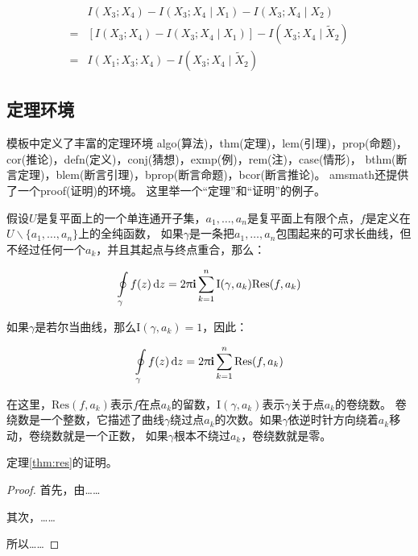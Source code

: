\begin{align}
  \label{eq:none}
  & I(X_3;X_4)-I(X_3;X_4\mid{}X_1)-I(X_3;X_4\mid{}X_2) \nonumber \\
  = & [I(X_3;X_4)-I(X_3;X_4\mid{}X_1)]-I(X_3;X_4\mid{}\tilde{X}_2) \\
  = & I(X_1;X_3;X_4)-I(X_3;X_4\mid{}\tilde{X}_2)
\end{align}

\subsection{定理环境}

模板中定义了丰富的定理环境
algo(算法)，thm(定理)，lem(引理)，prop(命题)，cor(推论)，defn(定义)，conj(猜想)，exmp(例)，rem(注)，case(情形)，
bthm(断言定理)，blem(断言引理)，bprop(断言命题)，bcor(断言推论)。
amsmath还提供了一个proof(证明)的环境。
这里举一个“定理”和“证明”的例子。
\begin{thm}[留数定理]
\label{thm:res}
  假设$U$是复平面上的一个单连通开子集，$a_1,\ldots,a_n$是复平面上有限个点，$f$是定义在$U\backslash \{a_1,\ldots,a_n\}$上的全纯函数，
  如果$\gamma$是一条把$a_1,\ldots,a_n$包围起来的可求长曲线，但不经过任何一个$a_k$，并且其起点与终点重合，那么：

  \begin{equation}
    \label{eq:res}
    \ointop_{\gamma}f(z)\,\mathrm{d}z = 2\uppi\mathbf{i}\sum^n_{k=1}\mathrm{I}(\gamma,a_k)\mathrm{Res}(f,a_k)
  \end{equation}

  如果$\gamma$是若尔当曲线，那么$\mathrm{I}(\gamma, a_k)=1$，因此：

  \begin{equation}
    \label{eq:resthm}
    \ointop_{\gamma}f(z)\,\mathrm{d}z = 2\uppi\mathbf{i}\sum^n_{k=1}\mathrm{Res}(f,a_k)
  \end{equation}


  在这里，$\mathrm{Res}(f, a_k)$表示$f$在点$a_k$的留数，$\mathrm{I}(\gamma,a_k)$表示$\gamma$关于点$a_k$的卷绕数。
  卷绕数是一个整数，它描述了曲线$\gamma$绕过点$a_k$的次数。如果$\gamma$依逆时针方向绕着$a_k$移动，卷绕数就是一个正数，
  如果$\gamma$根本不绕过$a_k$，卷绕数就是零。

  定理\ref{thm:res}的证明。
  
  \begin{proof}
    首先，由……

    其次，……

    所以……
  \end{proof}
\end{thm}

